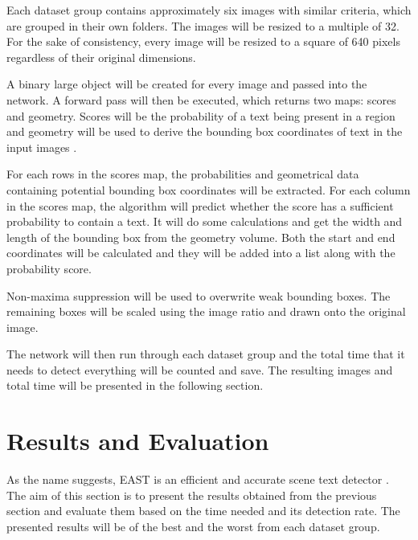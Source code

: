 \documentclass[10pt, a4paper]{article}
\begin{document}
Each dataset group contains approximately six images with similar criteria, which are grouped in their own folders. The images will be resized to a multiple of 32. For the sake of consistency, every image will be resized to a square of 640 pixels regardless of their original dimensions.

A binary large object will be created for every image and passed into the network. A forward pass will then be executed, which returns two maps: scores and geometry. 
Scores will be the probability of a text being present in a region and geometry will be used to derive the bounding box coordinates of text in the input images \citep{Rosebrockeast}.

For each rows in the scores map, the probabilities and geometrical data containing potential bounding box coordinates will be extracted.
For each column in the scores map, the algorithm will predict whether the score has a sufficient probability to contain a text. It will do some calculations and get the width and length of the bounding box from the geometry volume. Both the start and end coordinates will be calculated and they will be added into a list along with the probability score.

Non-maxima suppression will be used to overwrite weak bounding boxes. The remaining boxes will be scaled using the image ratio and drawn onto the original image.

The network will then run through each dataset group and the total time that it needs to detect everything will be counted and save.
The resulting images and total time will be presented in the following section.

\clearpage
\section{Results and Evaluation} %
\label{sec:evaluation}
As the name suggests, EAST is an efficient and accurate scene text detector \citep{EastZhouEtAl}. The aim of this section is to present the results obtained from the previous section and evaluate them based on the time needed and its detection rate. The presented results will be of the best and the worst from each dataset group.
\end{document}
